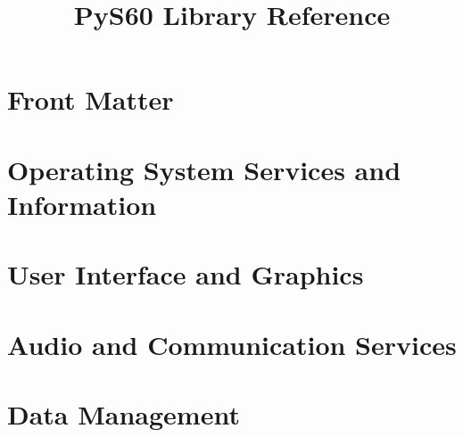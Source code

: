 \documentclass{manual}
\title{PyS60 Library Reference}
\begin{document}
\maketitle

\ifhtml
\chapter*{Front Matter\label{front}}
\fi



%

\tableofcontents





\chapter{Operating System Services and Information \label{s60os}}




\chapter{User Interface and Graphics \label{s60graph}}









\chapter{Audio and Communication Services \label{s60ac}}








\chapter{Data Management \label{s60data}}






\end{document}
